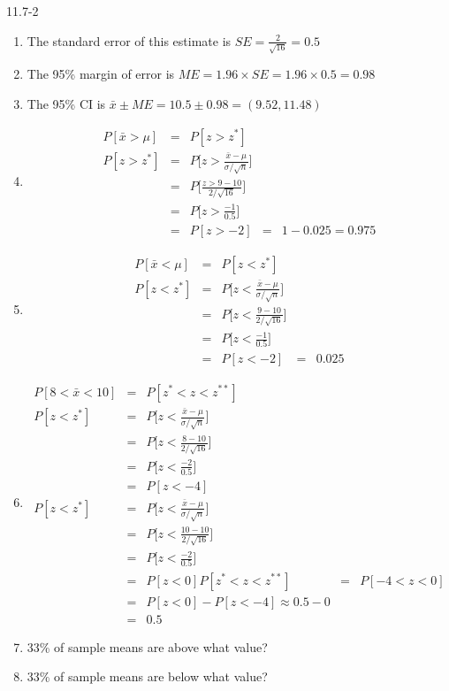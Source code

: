 \begin{exsol@solution}{11.7-2}
\begin{enumerate}
  \item The standard error of this estimate is $SE = \frac{2}{\sqrt{16}} = 0.5$
  \item The 95\% margin of error is $ME = 1.96 \times SE = 1.96 \times 0.5 = 0.98$
  \item The 95\% CI is $\bar{x} \pm ME = 10.5 \pm 0.98 = (9.52, 11.48) $
  \item
  \begin{eqnarray*}
      P[ \bar{x} > \mu ] &=& P[z > z^*] \\
       P[z > z^*] &=& P\Big[ z > \frac{ \bar{x}-\mu}{ \sigma/\sqrt{n}} \Big] \\
       &=& P\Big[ \frac{z > 9 - 10}{ 2/\sqrt{16}} \Big] \\
       &=& P\Big[ z > \frac{-1}{0.5} \Big]   \\
        &=& P[z > -2]
        &=& 1 - 0.025 = 0.975
  \end{eqnarray*}

  \item
  \begin{eqnarray*}
      P[ \bar{x} < \mu ] &=& P[z < z^*] \\
       P[z < z^*] &=& P\Big[ z < \frac{ \bar{x}-\mu}{ \sigma/\sqrt{n}} \Big] \\
       &=& P\Big[ z < \frac{ 9 - 10}{ 2/\sqrt{16}} \Big] \\
       &=& P\Big[ z < \frac{-1}{0.5} \Big]   \\
        &=& P[z < -2]
        &=&  0.025
  \end{eqnarray*}

  \item
  \begin{eqnarray*}
      P[ 8 < \bar{x} < 10 ] &=& P[ z^* < z < z^{**} ] \\
       P[z < z^*] &=& P\Big[ z < \frac{ \bar{x}-\mu}{ \sigma/\sqrt{n}} \Big] \\
       &=& P\Big[ z < \frac{ 8 - 10}{ 2/\sqrt{16}} \Big] \\
       &=& P\Big[ z < \frac{-2}{0.5} \Big]   \\
        &=& P[z < -4] \\
        P[z < z^*] &=& P\Big[ z < \frac{ \bar{x}-\mu}{ \sigma/\sqrt{n}} \Big] \\
       &=& P\Big[ z < \frac{ 10 - 10}{ 2/\sqrt{16}} \Big] \\
       &=& P\Big[ z < \frac{-2}{0.5} \Big]   \\
        &=& P[z < 0]
      P[ z^* < z < z^{**} ] &=& P[ -4 < z < 0] \\
        &=&  P[ z < 0 ] - P[z < -4] \approx 0.5 - 0 \\
        &=& 0.5
  \end{eqnarray*}



  \item 33\% of sample means are above what value?
  \item 33\% of sample means are below what value?
\end{enumerate}
\end{exsol@solution}
